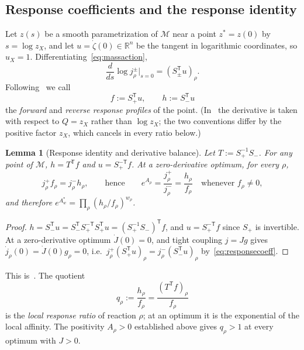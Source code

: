 \documentclass[11pt,reqno]{amsart}
\theoremstyle{plain}
\newtheorem{lemma}[theorem]{Lemma}
\theoremstyle{definition}
\theoremstyle{remark}
\numberwithin{equation}{section}
\newcommand{\R}{\mathbb{R}}
\newcommand{\Sp}{S_{+}}
\newcommand{\Sm}{S_{-}}
\newcommand{\T}{\mathsf{T}}
\begin{document}
\subsection{Response coefficients and the response identity}\label{subsec:response}
Let $z(s)$ be a smooth parametrization of $\mathcal M$ near a point $z^*=z(0)$ by $s=\log z_X$, and let $u=\dot\zeta(0)\in\R^n$ be the tangent in logarithmic coordinates, so $u_X=1$.  Differentiating~\eqref{eq:massaction},
\begin{equation}\label{eq:responsecoeff}
\frac{d}{ds}\log j^\pm_\rho\Big|_{s=0}=(S_\pm^{\T}u)_\rho.
\end{equation}
Following~\cite[Eq.~(26)]{DDL24} we call
\begin{equation}\label{eq:fh}
f:=\Sp^{\T}u,\qquad h:=\Sm^{\T}u
\end{equation}
the \emph{forward} and \emph{reverse response profiles} of the point.  (In~\cite{DDL24} the derivative is taken with respect to $Q=z_X$ rather than $\log z_X$; the two conventions differ by the positive factor $z_X$, which cancels in every ratio below.)

\begin{lemma}[Response identity and derivative balance]\label{lem:response}
Let $T:=\Sp^{-1}\Sm$.  For any point of $\mathcal M$, $h=T^{\T}f$ and $u=\Sp^{-\T}f$.  At a zero-derivative optimum, for every $\rho$,
\begin{equation}\label{eq:balance}
j^+_\rho f_\rho=j^-_\rho h_\rho,\qquad\text{hence}\qquad e^{A_\rho}=\frac{j^+_\rho}{j^-_\rho}=\frac{h_\rho}{f_\rho}\quad\text{whenever }f_\rho\ne0,
\end{equation}
and therefore $e^{A^*_w}=\prod_\rho(h_\rho/f_\rho)^{w_\rho}$.
\end{lemma}

\begin{proof}
$h=\Sm^{\T}u=\Sm^{\T}\Sp^{-\T}\Sp^{\T}u=(\Sp^{-1}\Sm)^{\T}f$, and $u=\Sp^{-\T}f$ since $\Sp$ is invertible.  At a zero-derivative optimum $\dot J(0)=0$, and tight coupling $j=Jg$ gives $\dot j_\rho(0)=\dot J(0)g_\rho=0$, i.e.\ $j^+_\rho(\Sp^{\T}u)_\rho=j^-_\rho(\Sm^{\T}u)_\rho$ by~\eqref{eq:responsecoeff}.
\end{proof}

This is~\cite[Eqs.~(27)--(30)]{DDL24}.  The quotient
\begin{equation}\label{eq:q}
q_\rho:=\frac{h_\rho}{f_\rho}=\frac{(T^{\T}f)_\rho}{f_\rho}
\end{equation}
is the \emph{local response ratio} of reaction $\rho$; at an optimum it is the exponential of the local affinity.  The positivity $A_\rho>0$ established above gives $q_\rho>1$ at every optimum with $J>0$.
\end{document}
